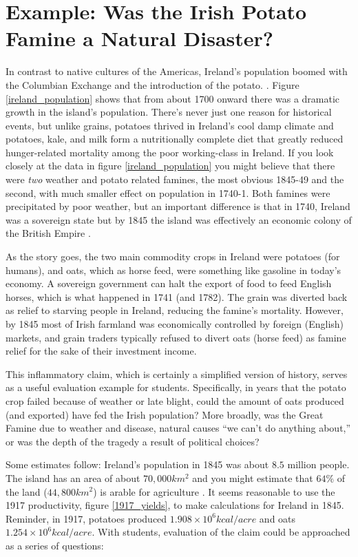 \documentclass[12pt]{iopart}
\begin{document}
\clearpage


\section{Example: Was the Irish Potato Famine a Natural Disaster?}
In contrast to native cultures of the Americas, Ireland's population boomed with the Columbian Exchange and the introduction of the potato. \cite{potato,little_ice_age}.  Figure \ref{ireland_population} shows that from about 1700 onward there was a dramatic growth in the island's population.  There's never just one reason for historical events, but unlike grains, potatoes thrived in Ireland's cool damp climate and potatoes, kale, and milk form a nutritionally complete diet that greatly reduced hunger-related mortality among the poor working-class in Ireland.  If you look closely at the data in figure \ref{ireland_population} you might believe that there were \textit{two} weather and potato related famines, the most obvious 1845-49 and the second, with much smaller effect on population in 1740-1.  Both famines were precipitated by poor weather, but an important difference is that in 1740, Ireland was a sovereign state but by 1845 the island was effectively an economic colony of the British Empire \cite{little_ice_age}.  

As the story goes, the two main commodity crops in Ireland were potatoes (for humans), and oats, which as horse feed, were something like gasoline in today's economy.  A sovereign government can halt the export of food to feed English horses, which is what happened in 1741 (and 1782). The grain was diverted back as relief to starving people in Ireland, reducing the famine's mortality. However, by 1845 most of Irish farmland was economically controlled by foreign (English) markets, and grain traders typically refused to divert oats (horse feed) as famine relief for the sake of their investment income.

This inflammatory claim, which is certainly a simplified version of history, serves as a useful evaluation example for students. Specifically, in years that the potato crop failed because of weather or late blight, could the amount of oats produced (and exported) have fed the Irish population?  More broadly, was the Great Famine due to weather and disease, natural causes ``we can't do anything about,''  or was the depth of the tragedy a result of political choices?

Some estimates follow:  Ireland's population in 1845 was about $8.5$ million people.  The island has an area of about $70,000km^2$ and you might estimate that $64\%$ of the land ($44,800km^2$) is arable for agriculture \cite{arable_percentage}.  
It seems reasonable to use the 1917 productivity,  figure \ref{1917_yields},  to make calculations for Ireland in 1845.  Reminder, in 1917, potatoes produced $1.908\times10^6 kcal/acre$ and oats $1.254\times10^6kcal/acre$.
With students, evaluation of the claim could be approached as a series of questions:
\end{document}
